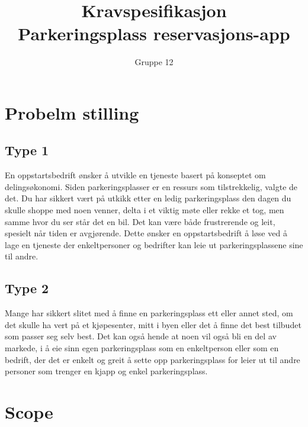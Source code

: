 \documentclass[12pt]{article}
\begin{document}
\title{%
    Kravspesifikasjon\\
    \large Parkeringsplass reservasjons-app }
\author{Gruppe 12}
\date{}
\maketitle

\newpage

\tableofcontents

\newpage

\section{Probelm stilling}

\subsection{Type 1}
En oppstartsbedrift ønsker å utvikle en tjeneste basert på konseptet om delingsøkonomi. Siden parkeringsplasser er en ressurs som tilstrekkelig, valgte de det. Du har sikkert vært på utkikk etter en ledig parkeringsplass den dagen du skulle shoppe med noen venner, delta i et viktig møte eller rekke et tog, men samme hvor du ser står det en bil. Det kan være både frustrerende og leit, spesielt når tiden er avgjørende. Dette ønsker en oppstartsbedrift å løse ved å lage en tjeneste der enkeltpersoner og bedrifter kan leie ut parkeringsplassene sine til andre.

\subsection{Type 2}
Mange har sikkert slitet med å finne en parkeringsplass ett eller annet sted, om det skulle ha vert på et kjøpesenter, mitt i byen eller det å finne det best tilbudet som passer seg selv best. Det kan også hende at noen vil også bli en del av markede, i å eie sinn egen parkeringsplass som en enkeltperson eller som en bedrift, der det er enkelt og greit å sette opp parkeringsplass for leier ut til andre personer som trenger en kjapp og enkel parkeringsplass. 

\section{Scope}

\end{document}
